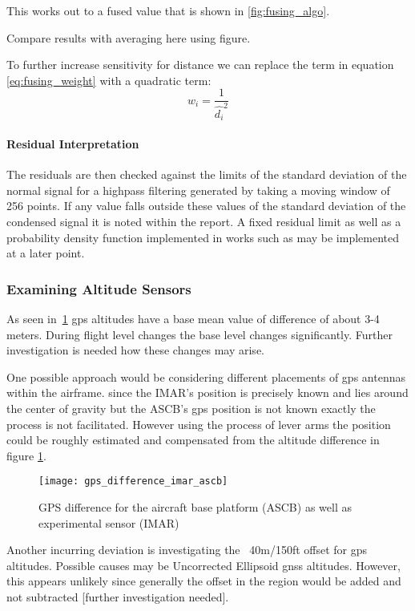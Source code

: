 This works out to a fused value that is shown in \ref{fig:fusing_algo}.

Compare results with averaging here using figure.

To further increase sensitivity for distance we can replace the term in equation \ref{eq:fusing_weight} with a quadratic term:
\begin{equation}
        w_i=\frac{1}{\hat{d_i}^2}
\end{equation}
\paragraph{Residual Interpretation}


The residuals are then checked against the limits of the standard deviation of the normal signal for a highpass filtering generated by taking a moving window of 256 points. If any value falls outside these values of the standard deviation of the condensed signal it is noted within the report. A fixed residual limit as well as a probability density function implemented in works such as \cite{svard_data-driven_2014} may be implemented at a later point.

\subsubsection{Examining Altitude Sensors}

As seen in~\ref{fig:gps_diff} gps altitudes have a base mean value of difference of about 3-4 meters. During flight level changes the base level changes significantly. Further investigation is needed how these changes may arise.

One possible approach would be considering different placements of gps antennas within the airframe. since the IMAR's position is precisely known and lies around the center of gravity but the ASCB's gps position is not known exactly the process is not facilitated. However using the process of lever arms the position could be roughly estimated and compensated from the altitude difference in figure \ref{fig:gps_diff}.

\begin{figure}[h]
    \centering
    \texttt{[image: gps\_difference\_imar\_ascb]}
    \caption{GPS difference for the aircraft base platform (ASCB) as well as experimental sensor (IMAR)}
    \label{fig:gps_diff}
\end{figure}

Another incurring deviation is investigating the ~40m/150ft offset for gps altitudes. Possible causes may be Uncorrected Ellipsoid gnss altitudes. However, this appears unlikely since generally the offset in the region would be added and not subtracted [further investigation needed].


